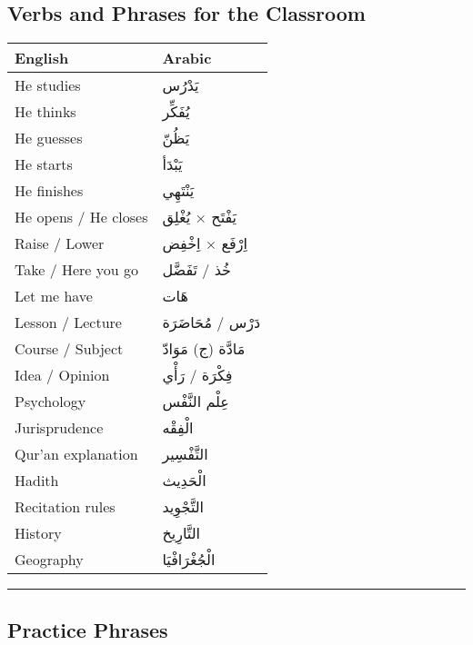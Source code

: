 \documentclass[
  a4paper,
  DIV=11,
  numbers=noendperiod]{scrartcl}
\begin{document}
\subsection{Verbs and Phrases for the
Classroom}\label{verbs-and-phrases-for-the-classroom}

\begin{longtable}[]{@{}ll@{}}
\toprule\noalign{}
English & Arabic \\
\midrule\noalign{}
\endhead
\bottomrule\noalign{}
\endlastfoot
He studies & يَدْرُس \\
He thinks & يُفَكِّر \\
He guesses & يَظُنّ \\
He starts & يَبْدَأ \\
He finishes & يَنْتَهِي \\
He opens / He closes & يَفْتَح × يُغْلِق \\
Raise / Lower & اِرْفَع × اِخْفِض \\
Take / Here you go & خُذ / تَفَضَّل \\
Let me have & هَات \\
Lesson / Lecture & دَرْس / مُحَاضَرَة \\
Course / Subject & مَادَّة (ج) مَوَادّ \\
Idea / Opinion & فِكْرَة / رَأْي \\
Psychology & عِلْم النَّفْس \\
Jurisprudence & الْفِقْه \\
Qur'an explanation & التَّفْسِير \\
Hadith & الْحَدِيث \\
Recitation rules & التَّجْوِيد \\
History & التَّارِيخ \\
Geography & الْجُغْرَافْيَا \\
\end{longtable}

\begin{center}\rule{0.5\linewidth}{0.5pt}\end{center}

\subsection{Practice Phrases}\label{practice-phrases-1}
\end{document}
